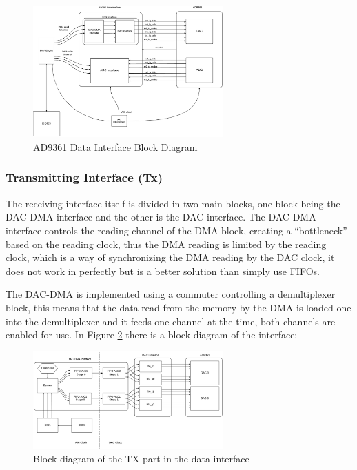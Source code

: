 \begin{figure}[htbp]
    \centering
    \includegraphics[width=0.65\textwidth]{./figures/data_if}
    \caption{ AD9361 Data Interface Block Diagram
    \label{fig:databd}}
\end{figure}

\subsubsection{Transmitting Interface (Tx)}

The receiving interface itself is divided in two main blocks, one block being the
DAC-DMA interface and the other is the DAC interface. The DAC-DMA interface controls
the reading channel of the DMA block, creating a “bottleneck” based on the reading
clock, thus the DMA reading is limited by the reading clock, which is a way of
synchronizing the DMA reading by the DAC clock, it does not work in perfectly but
is a better solution than simply use FIFOs.

The DAC-DMA is implemented using a commuter controlling a demultiplexer block,
this means that the data read from the memory by the DMA is loaded one into the
demultiplexer and it feeds one channel at the time, both channels are enabled
for use. In Figure \ref{fig:dataiftx} there is a block diagram of the interface:

\begin{figure}[htbp]
    \centering
    \includegraphics[width=0.65\textwidth]{./figures/txdata_if}
    \caption{ Block diagram of the TX part in the data interface
    \label{fig:dataiftx}}
\end{figure}

